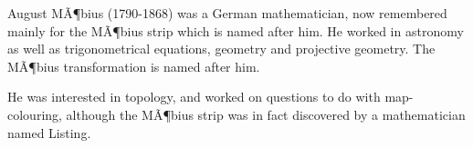 August MÃ¶bius (1790-1868) was a German mathematician, now remembered mainly for the
MÃ¶bius strip which is named after him. He worked in astronomy as well as
trigonometrical equations, geometry and projective geometry. The 
MÃ¶bius transformation is named after him.
\par
He was interested in topology, and worked on questions to do with map-colouring,
although the MÃ¶bius strip was in fact discovered by a mathematician named Listing.
